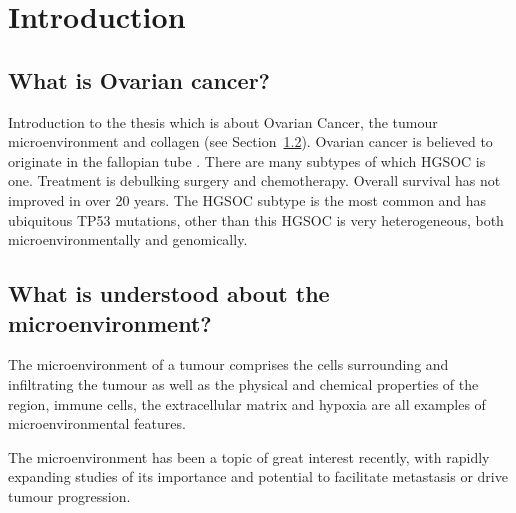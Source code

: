 
\chapter{Introduction}  %

\ifpdf
    \graphicspath{{Introduction/Figs/Raster/}{Introduction/Figs/PDF/}{Introduction/Figs/}}
\else
    \graphicspath{{Introduction/Figs/Vector/}{Introduction/Figs/}}
\fi


\section{What is Ovarian cancer?} %

Introduction to the thesis which is about Ovarian Cancer, the tumour microenvironment and collagen (see 
Section~\ref{section1.3}). Ovarian cancer is believed to originate in the fallopian tube \citep{AAB95,Con90,LM65}. There are many subtypes of which HGSOC is one.  Treatment is debulking surgery and chemotherapy. Overall survival has not improved in over 20 years. The HGSOC subtype is the most common and has ubiquitous TP53 mutations, other than this HGSOC is very heterogeneous, both microenvironmentally and genomically.



\section{What is understood about the microenvironment?}  %
\label{section1.3}
The microenvironment of a tumour comprises the cells surrounding and infiltrating the tumour as well as the physical and chemical properties of the region, immune cells, the extracellular matrix and hypoxia are all examples of microenvironmental features.

The microenvironment has been a topic of great interest recently, with rapidly expanding studies of its importance and potential to facilitate metastasis or drive tumour progression. \citep{RN22, RN10, RN37,RN11, RN2, RN26}

